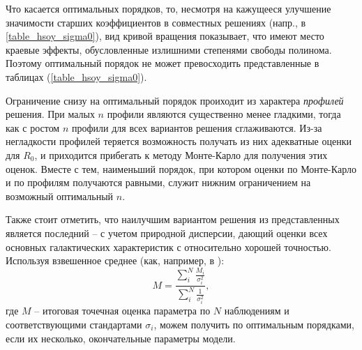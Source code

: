 \documentclass{matmex-diploma-custom}
\begin{document}
\par Что касается оптимальных порядков, то, несмотря на кажущееся улучшение значимости старших коэффициентов в совместных решениях (напр., в \ref{table_hsoy_sigma0}), вид кривой вращения показывает, что имеют место краевые эффекты, обусловленные излишними степенями свободы полинома.  Поэтому оптимальный порядок не может превосходить представленные в таблицах (\ref{table_hsoy_sigma0}). 
\par Ограничение снизу на оптимальный порядок проиходит из характера \textit{профилей} решения. При малых $n$ профили являются существенно менее гладкими, тогда как с ростом $n$ профили для всех вариантов решения сглаживаются. Из-за негладкости профилей теряется возможность получать из них адекватные оценки для $R_0$, и приходится прибегать к методу Монте-Карло для получения этих оценок. Вместе с тем, наименьший порядок, при котором оценки по Монте-Карло и по профилям получаются равными, служит нижним ограничением на возможный оптимальный $n$.
\par Также стоит отметить, что наилучшим вариантом решения из представленных является последний -- с учетом природной дисперсии, дающий оценки всех основных галактических характеристик с относительно хорошей точностью. Используя взвешенное среднее (как, например, в \cite{Camarillo}):
\begin{equation}
        M = \frac{\sum_i^N \frac{M_i}{\sigma_i^2}}{\sum_i^N \frac{1}{\sigma_i^2}},
\end{equation}
где $M$ -- итоговая точечная оценка параметра по $N$ наблюдениям и соответствующими стандартами $\sigma_i$, можем получить по оптимальным порядками, если их несколько, окончательные параметры модели.
\pagebreak
\end{document}
